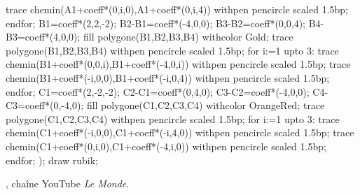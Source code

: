 \begin{debat}
\begin{center}
\begin{Geometrie}[CoinBG={u*(-10,-10)},TypeTrace="Espace"]
                trace chemin(A1+coeff*(0,i,0),A1+coeff*(0,i,4)) withpen pencircle scaled 1.5bp;				
            endfor;	
            B1=coeff*(2,2,-2);
            B2-B1=coeff*(-4,0,0);
            B3-B2=coeff*(0,0,4);
            B4-B3=coeff*(4,0,0);
            fill polygone(B1,B2,B3,B4) withcolor Gold;
            trace polygone(B1,B2,B3,B4) withpen pencircle scaled 1.5bp;
            for i:=1 upto 3:
                trace chemin(B1+coeff*(0,0,i),B1+coeff*(-4,0,i)) withpen pencircle scaled 1.5bp;
                trace chemin(B1+coeff*(-i,0,0),B1+coeff*(-i,0,4)) withpen pencircle scaled 1.5bp;
            endfor;		
            C1=coeff*(2,-2,-2);
            C2-C1=coeff*(0,4,0);
            C3-C2=coeff*(-4,0,0);
            C4-C3=coeff*(0,-4,0);
            fill polygone(C1,C2,C3,C4) withcolor OrangeRed;
            trace polygone(C1,C2,C3,C4) withpen pencircle scaled 1.5bp;
            for i:=1 upto 3:
                trace chemin(C1+coeff*(-i,0,0),C1+coeff*(-i,4,0)) withpen pencircle scaled 1.5bp;
                trace chemin(C1+coeff*(0,i,0),C1+coeff*(-4,i,0)) withpen pencircle scaled 1.5bp;
            endfor;
            );
            draw rubik;	
        \end{Geometrie}
    \end{center}
    \bigskip
    \begin{changemargin}{0mm}{-10mm}
        \begin{cadre}[B2][F4]
            \begin{center}
                , chaîne YouTube {\it Le Monde}.
            \end{center}
        \end{cadre}
    \end{changemargin}
 \end{debat}